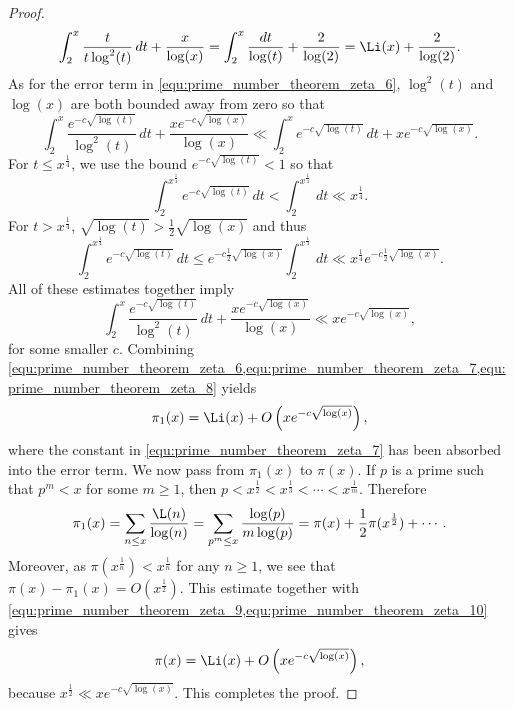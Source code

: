 \begin{proof}
        \begin{equation}\label{equ:prime_number_theorem_zeta_7}
          \int_{2}^{x}\frac{t}{t\log^{2}(t)}\,dt+\frac{x}{\log(x)} = \int_{2}^{x}\frac{dt}{\log(t)}+\frac{2}{\log(2)} = \Li(x)+\frac{2}{\log(2)}.
        \end{equation}
        As for the error term in \cref{equ:prime_number_theorem_zeta_6}, $\log^{2}(t)$ and $\log(x)$ are both bounded away from zero so that
        \[
          \int_{2}^{x}\frac{e^{-c\sqrt{\log(t)}}}{\log^{2}(t)}\,dt+\frac{xe^{-c\sqrt{\log(x)}}}{\log(x)} \ll \int_{2}^{x}e^{-c\sqrt{\log(t)}}\,dt+xe^{-c\sqrt{\log(x)}}.
        \]
        For $t \le x^{\frac{1}{4}}$, we use the bound $e^{-c\sqrt{\log(t)}} < 1$ so that
        \[
          \int_{2}^{x^{\frac{1}{4}}}e^{-c\sqrt{\log(t)}}\,dt < \int_{2}^{x^{\frac{1}{4}}}\,dt \ll x^{\frac{1}{4}}.
        \]
        For $t > x^{\frac{1}{4}}$, $\sqrt{\log(t)} > \frac{1}{2}\sqrt{\log(x)}$ and thus
        \[
          \int_{2}^{x^{\frac{1}{4}}}e^{-c\sqrt{\log(t)}}\,dt \le e^{-c\frac{1}{2}\sqrt{\log(x)}}\int_{2}^{x^{\frac{1}{4}}}\,dt \ll x^{\frac{1}{4}}e^{-c\frac{1}{2}\sqrt{\log(x)}}. 
        \]
        All of these estimates together imply
        \begin{equation}\label{equ:prime_number_theorem_zeta_8}
          \int_{2}^{x}\frac{e^{-c\sqrt{\log(t)}}}{\log^{2}(t)}\,dt+\frac{xe^{-c\sqrt{\log(x)}}}{\log(x)} \ll xe^{-c\sqrt{\log(x)}},
        \end{equation}
        for some smaller $c$. Combining \cref{equ:prime_number_theorem_zeta_6,equ:prime_number_theorem_zeta_7,equ:prime_number_theorem_zeta_8} yields
        \begin{equation}\label{equ:prime_number_theorem_zeta_9}
          \pi_{1}(x) = \Li(x)+O\left(xe^{-c\sqrt{\log(x)}}\right),
        \end{equation}
        where the constant in \cref{equ:prime_number_theorem_zeta_7} has been absorbed into the error term. We now pass from $\pi_{1}(x)$ to $\pi(x)$. If $p$ is a prime such that $p^{m} < x$ for some $m \ge 1$, then $p < x^{\frac{1}{2}} < x^{\frac{1}{3}} < \cdots < x^{\frac{1}{m}}$. Therefore
        \begin{equation}\label{equ:prime_number_theorem_zeta_10}
          \pi_{1}(x) = \sum_{n \le x}\frac{\L(n)}{\log(n)} = \sum_{p^{m} \le x}\frac{\log(p)}{m\log(p)} = \pi(x)+\frac{1}{2}\pi(x^{\frac{1}{2}})+\cdots.
        \end{equation}
        Moreover, as $\pi(x^{\frac{1}{n}}) < x^{\frac{1}{n}}$ for any $n \ge 1$, we see that $\pi(x)-\pi_{1}(x) = O(x^{\frac{1}{2}})$. This estimate together with \cref{equ:prime_number_theorem_zeta_9,equ:prime_number_theorem_zeta_10} gives
        \[
          \pi(x) = \Li(x)+O\left(xe^{-c\sqrt{\log(x)}}\right),
        \]
        because $x^{\frac{1}{2}} \ll xe^{-c\sqrt{\log(x)}}$. This completes the proof.
      \end{proof}

